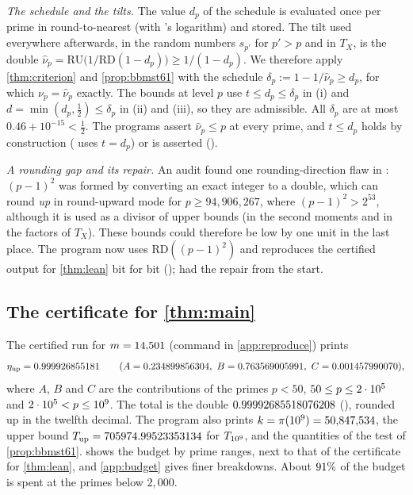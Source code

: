 \emph{The schedule and the tilts.} The value $d_p$ of the schedule is evaluated once per prime in round-to-nearest
(with 's logarithm) and stored. The tilt used everywhere afterwards, in the random numbers $s_{p'}$ for
$p'>p$ and in $T_X$, is the double $\hat\nu_p=\mathrm{RU}\bigl(1/\mathrm{RD}(1-d_p)\bigr)\ge1/(1-d_p)$. We therefore
apply \cref{thm:criterion} and \cref{prop:bbmst61} with the schedule $\delta_p:=1-1/\hat\nu_p\ge d_p$, for which
$\nu_p=\hat\nu_p$ exactly. The bounds at level $p$ use $t\le d_p\le\delta_p$ in (i) and $d=\min(d_p,\frac12)\le\delta_p$
in (ii) and (iii), so they are admissible. All $\delta_p$ are at most $0.46+10^{-15}<\frac12$. The programs assert
$\hat\nu_p\le p$ at every prime, and $t\le d_p$ holds by construction ( uses $t=d_p$) or is asserted
().

\emph{A rounding gap and its repair.} An audit found one rounding-direction flaw in : $(p-1)^2$ was
formed by converting an exact integer to a double, which can round \emph{up} in round-upward mode for
$p\ge94{,}906{,}267$, where $(p-1)^2>2^{53}$, although it is used as a divisor of upper bounds (in the second moments
and in the factors of $T_X$). These bounds could therefore be low by one unit in the last place. The program now uses
$\mathrm{RD}((p-1)^2)$ and reproduces the certified output for \cref{thm:lean} bit for bit
();  had the repair from the start.

\subsection{The certificate for \cref{thm:main}}\label{sec:certified}

The certified run for $m=14{,}501$ (command in \cref{app:reproduce}) prints
\[
  \eta_{\mathrm{up}}=0.999926855181\qquad(A=0.234899856304,\ B=0.763569005991,\ C=0.001457990070),
\]
where $A$, $B$ and $C$ are the contributions of the primes $p<50$, $50\le p\le2\cdot 10^{5}$ and $2\cdot 10^{5}<p\le10^{9}$. The total
is the double $0.99992685518076208$ (\code{\etaMainHex}), rounded up in the twelfth decimal. The program also prints
$k=\pi(10^{9})=50{,}847{,}534$, the upper bound $T_{\mathrm{up}}=705974.99523353134$ for $T_{10^{9}}$, and the quantities of the
test of \cref{prop:bbmst61}.  shows the budget by prime ranges, next to that of the certificate for
\cref{thm:lean}, and \cref{app:budget} gives finer breakdowns. About $91\%$ of the budget is spent at the
primes below $2{,}000$.

